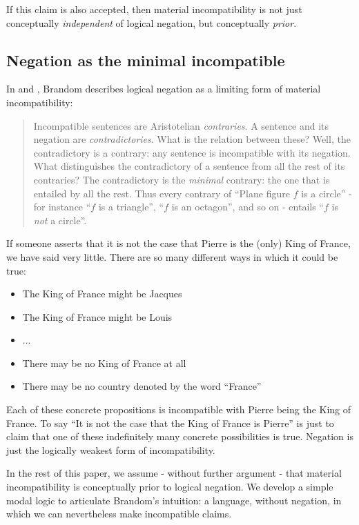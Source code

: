 \NI If this claim is also accepted, then material incompatibility is
not just conceptually \emph{independent} of logical negation, but
conceptually \emph{prior}.  

\subsection{Negation as the minimal incompatible}

In \cite{brandom2} and \cite{brandom}, Brandom describes 
logical negation as a limiting form of material incompatibility:
\begin{quote}
Incompatible sentences are Aristotelian \emph{contraries}. A sentence
and its negation are \emph{contradictories}. What is the relation
between these? Well, the contradictory is a contrary: any sentence is
incompatible with its negation. What distinguishes the contradictory
of a sentence from all the rest of its contraries? The contradictory
is the \emph{minimal} contrary: the one that is entailed by all the
rest. Thus every contrary of ``Plane figure $f$ is a circle'' - for
instance ``$f$ is a triangle'', ``$f$ is an octagon'', and so on -
entails ``$f$ is \emph{not} a circle''.
\end{quote}

\NI If someone asserts that it is not the case that Pierre is the (only) King of France,
we have said very little.  There are so many different ways in which
it could be true:
\begin{itemize}
\item
The King of France might be Jacques
\item
The King of France might be Louis
\item
...
\item
There may be no King of France at all
\item
There may be no country denoted by the word ``France''
\end{itemize}
Each of these concrete propositions is incompatible with Pierre being the King of France.
To say ``It is not the case that the King of France is Pierre'' is just to claim that one of these indefinitely many concrete possibilities is true.
Negation is just the logically weakest form of incompatibility.

In the rest of this paper, we assume - without further argument - that material incompatibility is conceptually prior to logical negation.
We develop a simple
 modal logic to articulate Brandom's intuition: a language, without negation, in which we can nevertheless make incompatible claims.

